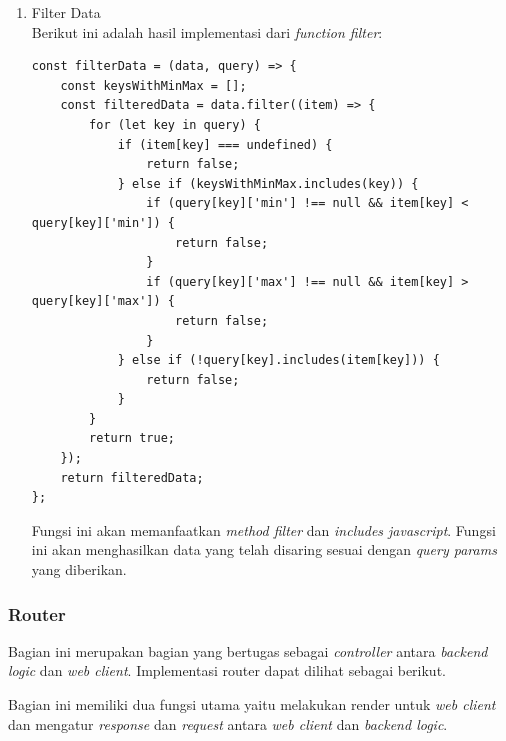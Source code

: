 \begin{enumerate}
\item{Filter Data} \\
Berikut ini adalah hasil implementasi dari \textit{function filter}:
\begin{lstlisting}[label=filter_method , caption=Fungsi Filter]
 const filterData = (data, query) => {
    const keysWithMinMax = [];
    const filteredData = data.filter((item) => {
        for (let key in query) {
            if (item[key] === undefined) {
                return false;
            } else if (keysWithMinMax.includes(key)) {
                if (query[key]['min'] !== null && item[key] < query[key]['min']) {
                    return false;
                }
                if (query[key]['max'] !== null && item[key] > query[key]['max']) {
                    return false;
                }
            } else if (!query[key].includes(item[key])) {
                return false;
            }
        }
        return true;
    });
    return filteredData;
};
\end{lstlisting}

Fungsi ini akan memanfaatkan \textit{method filter} dan \textit{includes javascript}. Fungsi ini akan menghasilkan data yang telah disaring sesuai dengan \textit{query params} yang diberikan.
 \end{enumerate}

\subsubsection{Router}
Bagian ini merupakan bagian yang bertugas sebagai \textit{controller} antara \textit{backend logic} dan \textit{web client}. Implementasi router dapat dilihat sebagai berikut.

 

Bagian ini memiliki dua fungsi utama yaitu melakukan render untuk \textit{web client} dan mengatur \textit{response} dan \textit{request} antara \textit{web client} dan \textit{backend logic}.


